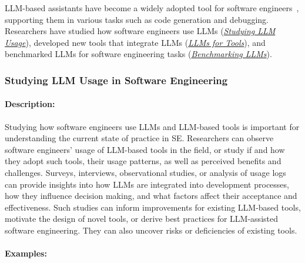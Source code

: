 \documentclass[smallextended]{svjour3}
\newcommand{\llmusage}{\hyperref[sec:studying-llm-usage-in-software-engineering]{\emph{Studying LLM Usage}}\xspace}
\newcommand{\newtools}{\hyperref[sec:llms-for-new-software-engineering-tools]{\emph{LLMs for Tools}}\xspace}
\newcommand{\benchmarkingtasks}{\hyperref[sec:benchmarking-llms-for-software-engineering-tasks]{\emph{Benchmarking LLMs}}\xspace}
\newcommand{\llmusage}{\href{/study-types\#studying-llm-usage-in-software-engineering}{\emph{Studying LLM Usage}}\xspace}
\newcommand{\newtools}{\href{/study-types\#llms-for-new-software-engineering-tools}{\emph{LLMs for Tools}}\xspace}
\newcommand{\benchmarkingtasks}{\href{/study-types\#benchmarking-llms-for-software-engineering-tasks}{\emph{Benchmarking LLMs}}\xspace}
\newcommand{\studytypesubsection}[1]{\subsubsection{#1}}
\newcommand{\studytypeparagraph}[1]{\paragraph{\bfseries #1:}}
\newcommand{\studytypesubsection}[1]{\subsection{#1}}
\newcommand{\studytypeparagraph}[1]{\subsubsection{#1}}
\begin{document}
LLM-based assistants have become a widely adopted tool for software engineers~\cite{stackoverflow2025survey}, supporting them in various tasks such as code generation and debugging.
Researchers have studied how software engineers use LLMs (\llmusage), developed new tools that integrate LLMs (\newtools), and benchmarked LLMs for software engineering tasks (\benchmarkingtasks).
 
\studytypesubsection{Studying LLM Usage in Software Engineering}
\label{sec:studying-llm-usage-in-software-engineering}

\studytypeparagraph{Description}

Studying how software engineers use LLMs and LLM-based tools is important for understanding the current state of practice in SE.
Researchers can observe software engineers' usage of LLM-based tools in the field, or study if and how they adopt such tools, their usage patterns, as well as perceived benefits and challenges.
Surveys, interviews, observational studies, or analysis of usage logs can provide insights into how LLMs are integrated into development processes, how they influence decision making, and what factors affect their acceptance and effectiveness. 
Such studies can inform improvements for existing LLM-based tools, motivate the design of novel tools, or derive best practices for LLM-assisted software engineering.
They can also uncover risks or deficiencies of existing tools.

\studytypeparagraph{Examples}
\end{document}

